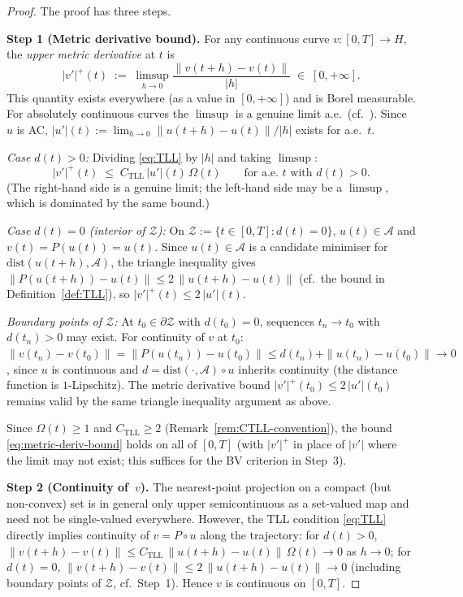 \documentclass[12pt,a4paper]{article}
\theoremstyle{definition}
\theoremstyle{plain}
\theoremstyle{remark}
\newcommand{\dist}{\mathrm{dist}}
\begin{document}
\begin{proof}
The proof has three steps.

\medskip
\noindent
\textbf{Step 1 (Metric derivative bound).}\;
For any continuous curve $v: [0,T] \to H$, the \emph{upper
metric derivative} at $t$ is
\[
  |v'|^+(t)
  \;:=\;
  \limsup_{h \to 0} \frac{\|v(t+h) - v(t)\|}{|h|}
  \;\in\; [0,+\infty].
\]
This quantity exists everywhere (as a value in $[0,+\infty]$)
and is Borel measurable.  For absolutely continuous curves the
$\limsup$ is a genuine limit a.e.\
(cf.~\cite[Theorem~1.1.2]{AmbrosioGigliSavare2008}).
Since $u$ is AC, $|u'|(t) := \lim_{h\to 0}\|u(t+h)-u(t)\|/|h|$
exists for a.e.~$t$.

\smallskip\noindent
\emph{Case $d(t)>0$:}\;
Dividing \eqref{eq:TLL} by $|h|$ and taking $\limsup$:
\begin{equation}\label{eq:metric-deriv-bound}
  |v'|^+(t)
  \;\le\;
  C_{\mathrm{TLL}}\,|u'|(t)\,\Omega(t)
  \qquad \text{for a.e.\ } t \text{ with } d(t) > 0.
\end{equation}
(The right-hand side is a genuine limit; the left-hand side
may be a $\limsup$, which is dominated by the same bound.)

\smallskip\noindent
\emph{Case $d(t)=0$ (interior of $\mathcal{Z}$):}\;
On $\mathcal{Z} := \{t \in [0,T] : d(t) = 0\}$,
$u(t) \in \mathcal{A}$ and $v(t) = P(u(t)) = u(t)$.
Since $u(t) \in \mathcal{A}$ is a candidate minimiser for
$\dist(u(t+h), \mathcal{A})$, the triangle inequality gives
$\|P(u(t+h)) - u(t)\| \le 2\,\|u(t+h) - u(t)\|$
(cf.\ the bound in Definition~\ref{def:TLL}),
so $|v'|^+(t) \le 2\,|u'|(t)$.

\smallskip\noindent
\emph{Boundary points of $\mathcal{Z}$:}\;
At $t_0 \in \partial\mathcal{Z}$ with $d(t_0)=0$, sequences
$t_n \to t_0$ with $d(t_n) > 0$ may exist.  For continuity of
$v$ at $t_0$: $\|v(t_n) - v(t_0)\| = \|P(u(t_n)) - u(t_0)\|
\le d(t_n) + \|u(t_n) - u(t_0)\| \to 0$, since $u$ is
continuous and $d = \dist(\cdot,\mathcal{A}) \circ u$ inherits
continuity (the distance function is $1$-Lipschitz).  The metric derivative bound
$|v'|^+(t_0) \le 2\,|u'|(t_0)$ remains valid by the same
triangle inequality argument as above.

\smallskip\noindent
Since $\Omega(t) \ge 1$ and $C_{\mathrm{TLL}} \ge 2$
(Remark~\ref{rem:CTLL-convention}), the
bound \eqref{eq:metric-deriv-bound} holds on all of $[0,T]$
(with $|v'|^+$ in place of $|v'|$ where the limit may not
exist; this suffices for the BV criterion in Step~3).

\medskip
\noindent
\textbf{Step 2 (Continuity of~$v$).}\;
The nearest-point projection on a compact (but non-convex) set
is in general only upper semicontinuous as a set-valued map
and need not be single-valued everywhere.  However, the
TLL condition \eqref{eq:TLL} directly implies continuity
of $v = P \circ u$ along the trajectory: for $d(t) > 0$,
$\|v(t+h) - v(t)\| \le C_{\mathrm{TLL}}\,\|u(t+h)-u(t)\|\,
\Omega(t) \to 0$ as $h \to 0$; for $d(t) = 0$,
$\|v(t+h)-v(t)\| \le 2\,\|u(t+h)-u(t)\| \to 0$
(including boundary points of $\mathcal{Z}$, cf.\ Step~1).
Hence $v$ is continuous on $[0,T]$.


\end{proof}
\end{document}
